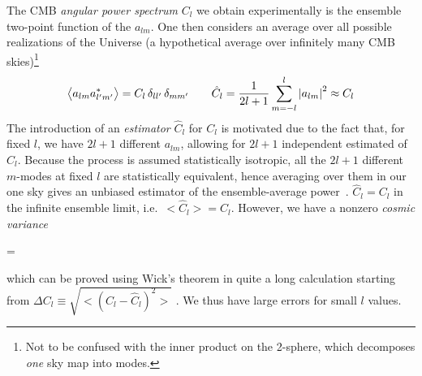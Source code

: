 The CMB \textit{angular power spectrum} $C_l$ we obtain experimentally is the ensemble two-point function of the $a_{lm}$.  One then considers an average over all possible realizations of the Universe (a hypothetical average over infinitely many CMB skies)\footnote{Not to be confused with the inner product on the 2-sphere, which decomposes \emph{one} sky map into modes.}
\begin{equation}\label{eq:ensembleAverage}
    \bigl<a_{lm}a^*_{l'm'} \bigr>=C_l \,\delta_{ll'}\,\delta_{mm'} \qquad \hat{C}_l = \frac{1}{2l+1} \sum_{m=-l}^l \abs{a_{lm}}^2 \approx C_l
\end{equation}
The introduction of an \textit{estimator} $\hat{C}_l$ for $C_l$ is motivated due to the fact that, for fixed $l$, we have $2l+1$ different $a_{lm}$, allowing for $2l+1$ independent estimated of $C_l$.
Because the process is assumed statistically isotropic, all the $2l+1$ different $m$-modes at fixed $l$ are statistically equivalent, hence averaging over them in our one sky gives an unbiased estimator of the ensemble-average power~\cite{CosmologyBau}.
$\hat{C}_l = C_l$ in the infinite ensemble limit, i.e.\ $\bigl<\hat{C}_l \bigr>=C_l$. However, we have a nonzero \textit{cosmic variance}
\begin{eqopt}[darkred]
    = 
\end{eqopt}
which can be proved using Wick's theorem in quite a long calculation starting from $\Delta C_l \equiv \sqrt{\bigl<(C_l-\hat{C}_l)^2 \bigr>}$ . We thus have large errors for small $l$ values.

 
